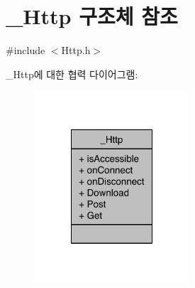 \hypertarget{struct___http}{\section{\-\_\-\-Http 구조체 참조}
\label{struct___http}
}


{\ttfamily \#include $<$Http.\-h$>$}



\-\_\-\-Http에 대한 협력 다이어그램\-:\nopagebreak
\begin{figure}[H]
\begin{center}
\leavevmode
\includegraphics[width=164pt]{d4/dd4/struct___http__coll__graph}
\end{center}
\end{figure}
